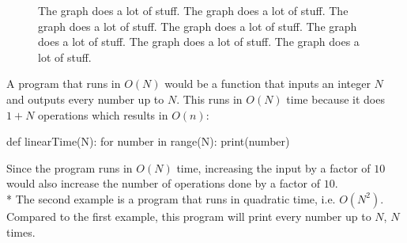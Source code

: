 \documentclass[main.tex]{subfiles}
\begin{document}
\begin{figure}[ht]
    \begin{center}
    \end{center}
\caption{The graph does a lot of stuff. The graph does a lot of stuff. The graph does a lot of stuff. The graph does a lot of stuff. The graph does a lot of stuff. The graph does a lot of stuff. The graph does a lot of stuff.}
\end{figure}

\vspace{10mm}

A program that runs in $O(N)$ would be a function that inputs an integer $N$ and outputs every number up to $N$. This runs in $O(N)$ time because it does $1+N$ operations which results in $O(n)$:
\begin{python}
def linearTime(N):
    for number in range(N):
        print(number)
\end{python}

Since the program runs in $O(N)$ time, increasing the input by a factor of $10$ would also increase the number of operations done by a factor of $10$.
\newline
\\*
The second example is a program that runs in quadratic time, i.e. $O(N^{2})$. Compared to the first example, this program will print every number up to $N$, $N$ times.
\end{document}
